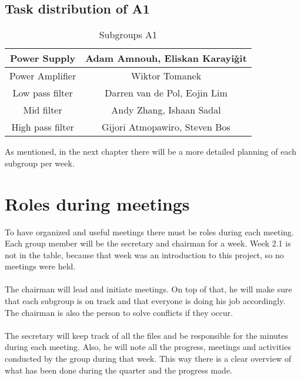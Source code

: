 \subsection{Task distribution of A1}

\begin{table}[h]
    \centering
    \setlength{\arrayrulewidth}{0.5mm}
    \setlength{\tabcolsep}{19pt}
    \renewcommand{\arraystretch}{1.5}
    \begin{tabular}{|c|c|}
    \hline
    Power Supply     &  Adam Amnouh, Eliskan Karayi\v git\\
    \hline
    Power Amplifier     & \hspace{50pt}Wiktor Tomanek \hspace{50pt}   \\
    \hline
    Low pass filter & Darren van de Pol, Eojin Lim\\
    \hline
    Mid filter & Andy Zhang, Ishaan Sadal \\
    \hline
    High pass filter & Gijori Atmopawiro, Steven Bos \\
    \hline
    \end{tabular}
    \captionsetup{justification=centering}
    \caption{Subgroups A1}
    \label{tab:my_label}
\end{table}


As mentioned, in the next chapter there will be a more detailed planning of each subgroup per week.


\section{Roles during meetings}
To have organized and useful meetings there must be roles during each meeting. Each group member will be the secretary and chairman for a week. Week 2.1 is not in the table, because that week was an introduction to this project, so no meetings were held.\\
\\
The chairman will lead and initiate meetings. On top of that, he will make sure that each subgroup is on track and that everyone is doing his job accordingly. The chairman is also the person to solve conflicts if they occur.\\
\\
The secretary will keep track of all the files and be responsible for the minutes during each meeting. Also, he will note all the progress, meetings and activities conducted by the group during that week. This way there is a clear overview of what has been done during the quarter and the progress made.
\newline

